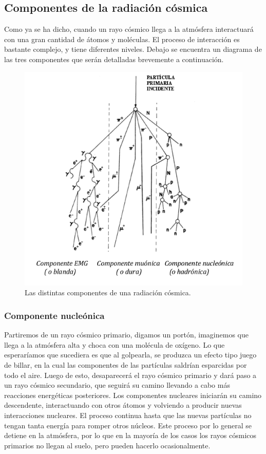 \documentclass[a4paper,10pt]{article}
\numberwithin{equation}{section}
\begin{document}
\subsection{Componentes de la radiación cósmica}

Como ya se ha dicho, cuando un rayo cósmico llega a la atmósfera interactuará con 
una gran cantidad de átomos y moléculas. El proceso de interacción es bastante complejo, 
y tiene diferentes niveles. Debajo se encuentra un diagrama de las tres componentes 
que serán detalladas brevemente a continuación. 

\begin{figure}[H]
 \center 
 \includegraphics[scale=0.7]{fig3-1}
 \caption{Las distintas componentes de una radiación cósmica.}
 \label{fig:fig3}
\end{figure}

\subsubsection{Componente nucleónica}

Partiremos de un rayo cósmico primario, digamos un portón, imaginemos que llega a la 
atmósfera alta y choca con una molécula de oxígeno. Lo que esperaríamos que sucediera 
es que al golpearla, se produzca un efecto tipo juego de billar, en la cual las componentes 
de las partículas saldrían esparcidas por todo el aire. Luego de esto, desaparecerá 
el rayo cósmico primario y dará paso a un rayo cósmico secundario, que seguirá su 
camino llevando a cabo más reacciones energéticas posteriores. Los componentes 
nucleares iniciarán su camino descendente, interactuando con otros átomos 
y volviendo a producir nuevas interacciones nucleares. El proceso continua hasta 
que las nuevas partículas no tengan tanta energía para romper otros núcleos. Este 
proceso por lo general se detiene en la atmósfera, por lo que en la mayoría de los 
casos los rayos cósmicos primarios no llegan al suelo, pero pueden hacerlo ocasionalmente.
\end{document}
